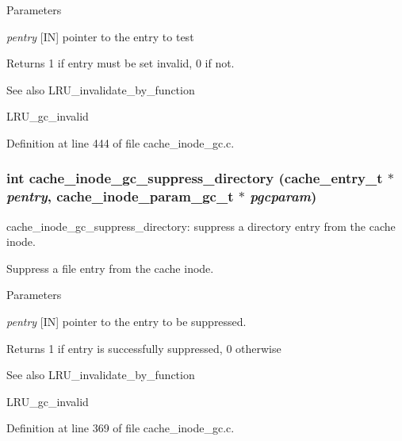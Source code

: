 \begin{DoxyParams}{Parameters}
\item[{\em pentry}][IN] pointer to the entry to test\end{DoxyParams}
\begin{DoxyReturn}{Returns}
1 if entry must be set invalid, 0 if not.
\end{DoxyReturn}
\begin{DoxySeeAlso}{See also}
LRU\_\-invalidate\_\-by\_\-function 

LRU\_\-gc\_\-invalid 
\end{DoxySeeAlso}


Definition at line 444 of file cache\_\-inode\_\-gc.c.
\subsubsection[{cache\_\-inode\_\-gc\_\-suppress\_\-directory}]{\setlength{\rightskip}{0pt plus 5cm}int cache\_\-inode\_\-gc\_\-suppress\_\-directory (cache\_\-entry\_\-t $\ast$ {\em pentry}, \/  cache\_\-inode\_\-param\_\-gc\_\-t $\ast$ {\em pgcparam})}\label{group__Cache__inode__gc__internal_ga24883ab5f9452a23cab665aabfc71873}
cache\_\-inode\_\-gc\_\-suppress\_\-directory: suppress a directory entry from the cache inode.

Suppress a file entry from the cache inode.


\begin{DoxyParams}{Parameters}
\item[{\em pentry}][IN] pointer to the entry to be suppressed.\end{DoxyParams}
\begin{DoxyReturn}{Returns}
1 if entry is successfully suppressed, 0 otherwise
\end{DoxyReturn}
\begin{DoxySeeAlso}{See also}
LRU\_\-invalidate\_\-by\_\-function 

LRU\_\-gc\_\-invalid 
\end{DoxySeeAlso}


Definition at line 369 of file cache\_\-inode\_\-gc.c.
